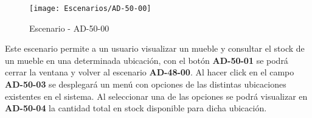 \begin{figure}[H]
\centering
\texttt{[image: Escenarios/AD-50-00]}
\caption{Escenario - AD-50-00}
\label{fig:AD-50-00}
\end{figure}

Este escenario permite a un usuario visualizar un mueble y consultar el stock de un mueble en una determinada ubicación, con el botón \textbf{AD-50-01} se podrá cerrar la ventana y volver al escenario \textbf{AD-48-00}. 
Al hacer click en el campo \textbf{AD-50-03} se desplegará un menú con opciones de las distintas ubicaciones existentes en el sistema. Al seleccionar una de las opciones se podrá visualizar en \textbf{AD-50-04} la cantidad total en stock disponible para dicha ubicación.
\clearpage
